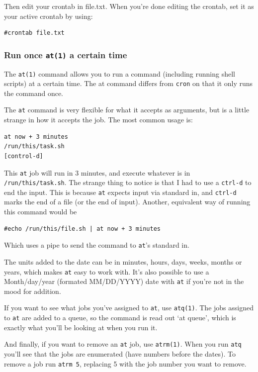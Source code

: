 Then edit your crontab in file.txt. When you're done editing the crontab, set it as
your active crontab by using:

\begin{verbatim}
#crontab file.txt
\end{verbatim}


\subsubsection{Run once {\tt at(1)} a certain time}

The {\tt at(1)} command allows you to run a command (including running shell scripts) 
at a certain time. The at command differs from {\tt cron} on that it only 
runs the command once.

The {\tt at} command is very flexible for what it accepts as arguments,
but is a little strange in how it accepts the job. The most
common usage is:

\begin{verbatim}
at now + 3 minutes 
/run/this/task.sh    
[control-d]
\end{verbatim}

This  {\tt at} job will run in 3 minutes, and execute whatever is
in {\tt /run/this/task.sh}. The strange thing to notice is that I 
had to use a {\tt ctrl-d} to end the input. This is because 
{\tt at} expects input via standard in, and {\tt ctrl-d} marks the 
end of a file (or the end of input). Another, equivalent way of running this command would be

\begin{verbatim}
#echo /run/this/file.sh | at now + 3 minutes
\end{verbatim}

Which uses a pipe to send the command to {\tt at}'s standard in.

The units added to the date can be in minutes,
hours, days, weeks, months or years, which makes {\tt at} easy to work with. It's also 
possible to use a Month/day/year (formated MM/DD/YYYY) date with {\tt at} if you're not in 
the mood for addition.

If you want to see what jobs you've assigned to {\tt at}, use {\tt atq(1)}.
The jobs assigned to {\tt at} are added to a queue, so the command is 
read out `at queue', which is exactly what you'll be looking at when you 
run it.

And finally, if you want to remove an {\tt at} job, use {\tt atrm(1)}.
When you run {\tt atq} you'll see that the jobs are enumerated (have numbers before 
the dates). To remove a job run {\tt atrm 5}, replacing 5 with the job number you want to remove.
			
